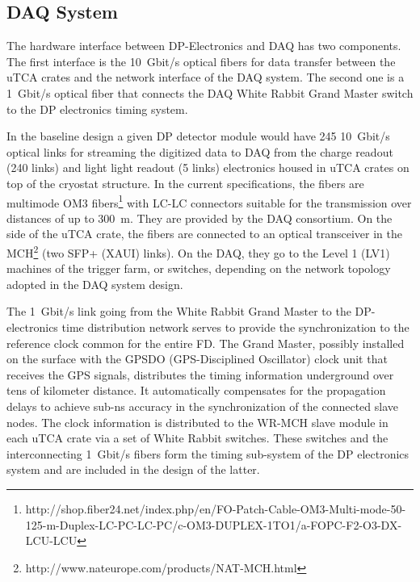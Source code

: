 

\subsection{DAQ System}
\label{sec:fddp-tpc-elec-intfc-daq}

The hardware interface between DP-Electronics and DAQ has two components. The first interface is the \SI{10}{Gbit/s} optical fibers for data transfer between the uTCA crates and the network interface of the DAQ system. The second one is a \SI{1}{Gbit/s} optical fiber that connects the DAQ White Rabbit Grand Master switch to the DP electronics timing system.   

In the baseline design a given DP detector module would have \num{245} \SI{10}{Gbit/s} optical links for streaming the digitized data to DAQ from the charge readout (\num{240} links) and light light readout (\num{5} links) electronics housed in uTCA crates on top of the cryostat structure.  In the current specifications, the fibers are multimode OM3 fibers\footnote{http://shop.fiber24.net/index.php/en/FO-Patch-Cable-OM3-Multi-mode-50-125-m-Duplex-LC-PC-LC-PC/c-OM3-DUPLEX-1TO1/a-FOPC-F2-O3-DX-LCU-LCU} with LC-LC connectors suitable for the transmission over distances of up to \SI{300}{\metre}.  They are provided by the DAQ consortium. On the side of the uTCA crate, the fibers are connected to an optical transceiver in the MCH\footnote{http://www.nateurope.com/products/NAT-MCH.html} (two SFP+ (XAUI) links).  On the DAQ, they go to the Level 1 (LV1) machines of the trigger farm, or switches, depending on the network topology adopted in the DAQ system design.

The \SI{1}{Gbit/s} link going from the White Rabbit Grand Master to the DP-electronics time distribution network serves to provide the synchronization to the reference clock common for the entire FD. The Grand Master, possibly installed on the surface with the GPSDO (GPS-Disciplined Oscillator) clock unit that receives the GPS signals, distributes the timing information underground over tens of kilometer distance. It automatically compensates for the propagation delays to achieve sub-ns accuracy in the synchronization of the connected slave nodes. The clock information is distributed to the WR-MCH slave module in each uTCA crate via a set of White Rabbit switches. These switches and the interconnecting \SI{1}{Gbit/s} fibers form the timing sub-system of the DP electronics system and are included in the design of the latter.    


